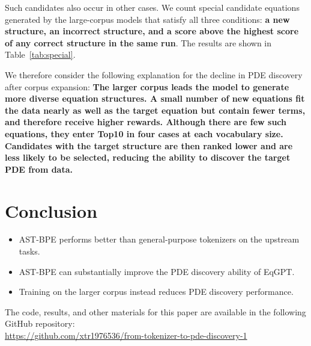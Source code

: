 \documentclass[11pt,letterpaper]{article}
\begin{document}
Such candidates also occur in other cases. We count special candidate equations generated by the large-corpus models that satisfy all three conditions: \textbf{a new structure, an incorrect structure, and a score above the highest score of any correct structure in the same run}. The results are shown in Table~\ref{tab:special}.
\begin{table}[H]
\caption{Special candidate statistics.}\label{tab:special}
\centering\small
\end{table}

\begin{samepage}
We therefore consider the following explanation for the decline in PDE discovery after corpus expansion: \textbf{The larger corpus leads the model to generate more diverse equation structures. A small number of new equations fit the data nearly as well as the target equation but contain fewer terms, and therefore receive higher rewards. Although there are few such equations, they enter Top10 in four cases at each vocabulary size. Candidates with the target structure are then ranked lower and are less likely to be selected, reducing the ability to discover the target PDE from data.}


\section{Conclusion}
\begin{itemize}\setlength{\itemsep}{0pt}\setlength{\parsep}{0pt}
\item AST-BPE performs better than general-purpose tokenizers on the upstream tasks.
\item AST-BPE can substantially improve the PDE discovery ability of EqGPT.
\item Training on the larger corpus instead reduces PDE discovery performance.
\end{itemize}

The code, results, and other materials for this paper are available in the following GitHub repository:\\
\url{https://github.com/xtr1976536/from-tokenizer-to-pde-discovery-1}

\end{samepage}
\endgroup
\FloatBarrier
\clearpage
\appendix
\end{document}
